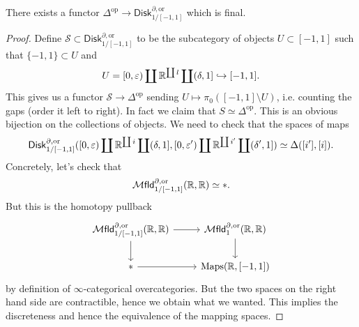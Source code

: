 \documentclass{amsart}
\begin{document}
\begin{lemma}[AF 3.11]
    There exists a functor $\Delta^\text{op}\to \mathsf{Disk}^{\partial, \text{or}}_{1/[-1,1]}$
    which is final.
\end{lemma}
\begin{proof}
    Define $\mathcal{S}\subset \mathsf{Disk}_{1/[-1,1]}^{\partial, \text{or}}$ to be the
    subcategory of objects $U\subset [-1,1]$ such that $\{-1,1\}\subset U$ and
    \begin{equation*}
        U=[0,\varepsilon)\coprod \mathbb{R}^{\coprod l}\coprod (\delta,1]\hookrightarrow [-1,1].
    \end{equation*}
    This gives us a functor $\mathcal{S}\to \Delta^\text{op}$ sending $U\mapsto \pi_0([-1,1]\setminus U)$,
    i.e. counting the gaps (order it left to right). In fact we claim that $S\simeq \Delta^\text{op}$.
    This is an obvious bijection on the collections of objects. We need to check that
    the spaces of maps
    \begin{equation*}
        \mathsf{Disk}_{1/[-1,1]}^{\partial,\text{or}}([0,\varepsilon)\coprod\mathbb{R}^{\coprod i}\coprod (\delta, 1], [0,\varepsilon')\coprod\mathbb{R}^{\coprod i'}\coprod (\delta',1]) \simeq \Delta([i'],[i]).
    \end{equation*}
    Concretely, let's check that
    \begin{equation*}
        \mathcal{M}\mathsf{fld}_{1/[-1,1]}^{\partial,\text{or}}(\mathbb{R},\mathbb{R})\simeq *.
    \end{equation*}
    But this is the homotopy pullback
    \begin{equation*}
        \begin{tikzcd}
            \mathcal{M}\mathsf{fld}_{1/[-1,1]}^{\partial,\text{or}}(\R,\R)\dar \rar & \mathcal{M}\mathsf{fld}_1^{\partial,\text{or}}(\R,\R)\dar \\
            * \rar & \Maps(\R, [-1,1])
        \end{tikzcd}
    \end{equation*}
    by definition of $\infty$-categorical overcategories.
    But the two spaces on the right hand side are contractible, hence we obtain what we wanted.
    This implies the discreteness and hence the equivalence of the mapping spaces.



\end{proof}
\end{document}
